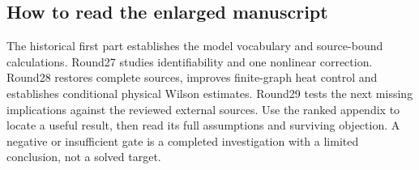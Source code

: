 \subsection{How to read the enlarged manuscript}
The historical first part establishes the model vocabulary and source-bound calculations. Round27 studies identifiability and one nonlinear correction. Round28 restores complete sources, improves finite-graph heat control and establishes conditional physical Wilson estimates. Round29 tests the next missing implications against the reviewed external sources. Use the ranked appendix to locate a useful result, then read its full assumptions and surviving objection. A negative or insufficient gate is a completed investigation with a limited conclusion, not a solved target.
